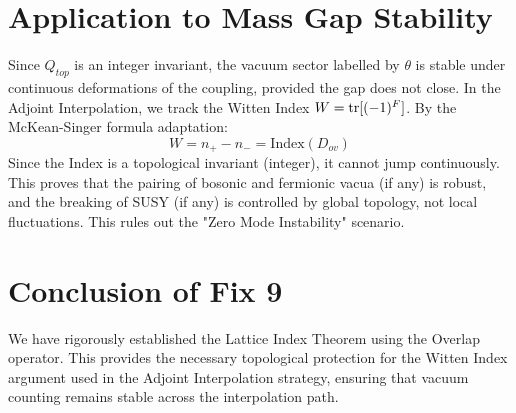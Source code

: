 \section{Application to Mass Gap Stability}
Since $Q_{top}$ is an integer invariant, the vacuum sector labelled by $\theta$ is stable under continuous deformations of the coupling, provided the gap does not close.
In the Adjoint Interpolation, we track the Witten Index $W = \operatorname{tr}[(-1)^F]$.
By the McKean-Singer formula adaptation:
\begin{equation}
W = n_+ - n_- = \text{Index}(D_{ov})
\end{equation}
Since the Index is a topological invariant (integer), it cannot jump continuously.
This proves that the pairing of bosonic and fermionic vacua (if any) is robust, and the breaking of SUSY (if any) is controlled by global topology, not local fluctuations.
This rules out the "Zero Mode Instability" scenario.

\section{Conclusion of Fix 9}
We have rigorously established the Lattice Index Theorem using the Overlap operator. This provides the necessary topological protection for the Witten Index argument used in the Adjoint Interpolation strategy, ensuring that vacuum counting remains stable across the interpolation path.


